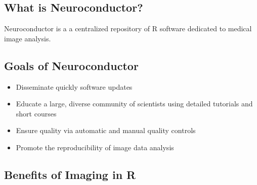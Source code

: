 \documentclass[final]{beamer}\usepackage[]{graphicx}\usepackage[]{color}
\title
{ %
Neuroconductor: An R Platform for Medical Imaging Analysis
}
\author{ %
John Muschelli\inst{1}, Jean-Philippe Fortin\inst{2}, Adrian Gherman\inst{1},Brian Avants\inst{2}, Brandon Whitcher\inst{3,4}, Jonathan D. Clayden\inst{5}, Brian S. Caffo\inst{1}, Ciprian M. Crainiceanu\inst{1}
}
\institute
[Johns Hopkins Bloomberg School of Public Health] %
{
\inst{1} Johns Hopkins Bloomberg School of Public Health, Department of
Biostatistics\\[0.3ex]
\inst{2} Perelman School of Medicine, University of Pennsylvania \;
\inst{3} Klarismo Ltd, London, UK\\[0.3ex]
\inst{4} Department of Mathematics, Imperial College London, London, UK \\[0.3ex]
\inst{5} Institute of Child Health, Developmental Imaging and Biophysics Section, University College London, UK
}
\date{\today}
\begin{document}
\vspace{-4cm}
\renewcommand{\thesubfigure}{\Alph{subfigure}}

\begin{frame}[fragile]
\vspace{-11cm}

\begin{table}[!htb]









\begin{minipage}{0.21\linewidth}
\section{What is Neuroconductor?}

Neuroconductor is a a centralized repository of R software dedicated to medical image analysis.

\subsection{Goals of Neuroconductor}

\begin{itemize}
\item Disseminate quickly software updates
\item Educate a large, diverse community of scientists using detailed tutorials and short courses
\item Ensure quality via automatic and manual quality controls
\item Promote the reproducibility of image data analysis
\end{itemize}

% 
% 
% 

\subsection{Benefits of Imaging in R}


\end{minipage}
\end{table}
\end{frame}
\end{document}

